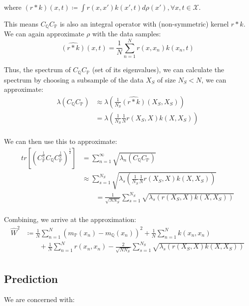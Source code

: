 \documentclass[twoside,11pt]{article}
\begin{document}
where $(r * k)(x, t) \coloneqq \int r(x, x')  k(x', t) d\rho(x'), \forall x, t \in \mathcal{X}$.

This means $C_{\mathbb{Q}}C_{\mathbb{P}}$ is also an integral operator with (non-symmetric) kernel $r * k$.
We can again approximate $\rho$ with the data samples:
\[\widehat{(r * k)}(x, t) = \frac{1}{N} \sum_{n=1}^N r(x, x_n)  k(x_n, t)\]

Thus, the spectrum of $C_{\mathbb{Q}}C_{\mathbb{P}}$ (set of its eigenvalues), we can calculate the spectrum by choosing a subsample of the data $X_S$ of size $N_S < N$, we can approximate:
\begin{align*}
\lambda\left( C_{\mathbb{Q}}C_{\mathbb{P}}\right) &\approx \lambda\left(\frac{1}{N_S}\widehat{(r * k)}(X_S, X_S)\right)\\
&= \lambda\left(\frac{1}{N_S}\frac{1}{N} r(X_S, X)  k(X, X_S)\right)\\
\end{align*}

We can then use this to approximate:
\begin{align*}
tr \left[ \left( C_{\mathbb{P}}^{\frac{1}{2}}C_{\mathbb{Q}}C_{\mathbb{P}}^{\frac{1}{2}}\right)^{\frac{1}{2}}\right] &= \sum_{n=1}^{\infty} \sqrt {\lambda_n\left( C_{\mathbb{Q}}C_{\mathbb{P}}\right)}\\
&\approx \sum_{s=1}^{N_S} \sqrt {\lambda_s\left( \frac{1}{N_S}\frac{1}{N} r(X_S, X)  k(X, X_S)\right)}\\
&\qquad = \frac{1}{\sqrt{N N_S}} \sum_{s=1}^{N_S} \sqrt {\lambda_s\left(  r(X_S, X)  k(X, X_S)\right)}\\
\end{align*}

Combining, we arrive at the approximation:
\[
\begin{split}
\hat{W}^2 & \coloneqq \frac{1}{N}\sum_{n=1}^N (m_{\mathbb{P}}(x_n)-m_{\mathbb{Q}}(x_n))^2 + \frac{1}{N}\sum_{n=1}^{N}k(x_n, x_n) \\
 &\qquad +\frac{1}{N}\sum_{n=1}^{N}r(x_n, x_n) - \frac{2}{\sqrt {N N_S}}\sum_{s=1}^{N_S}\sqrt {\lambda_s(r(X_S, X)k(X, X_S))} \\
\end{split}\label{eq:w-2-distance-approx}
\]

\subsection{Prediction}\label{subsec:gwi-for-regression-prediction}

We are concerned with:
\end{document}
